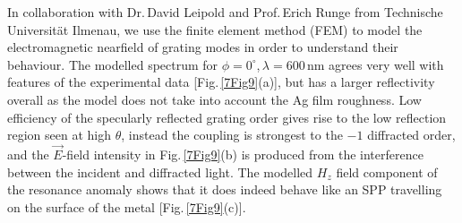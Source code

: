 In collaboration with Dr.\,David Leipold and Prof.\,Erich Runge from Technische Universit\"{a}t Ilmenau, we use the finite element method (FEM) to model the electromagnetic nearfield of grating modes in order to understand their behaviour. The modelled spectrum for $\phi=0^{\circ}$,\,$\lambda=600$\,nm agrees very well with features of the experimental data [Fig.\,\ref{7Fig9}(a)], but has a larger reflectivity overall as the model does not take into account the Ag film roughness. Low efficiency of the specularly reflected grating order gives rise to the low reflection region seen at high $\theta$, instead the coupling is strongest to the $-1$ diffracted order, and the $\vec{E}$-field intensity in Fig.\,\ref{7Fig9}(b) is produced from the interference between the incident and diffracted light. The modelled $H_z$ field component of the resonance anomaly shows that it does indeed behave like an SPP travelling on the surface of the metal [Fig.\,\ref{7Fig9}(c)].

